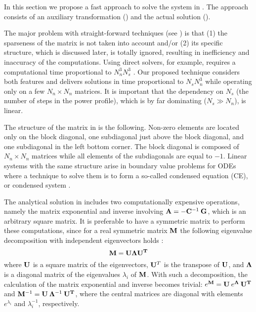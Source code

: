 In this section we propose a fast approach to solve the system in . The approach consists of an auxiliary transformation () and the actual solution ().

The major problem with straight-forward techniques (see ) is that (1) the sparseness of the matrix is not taken into account and/or (2) its specific structure, which is discussed later, is totally ignored, resulting in inefficiency and inaccuracy of the computations. Using direct solvers, for example, requires a computational time proportional to $N_n^3 N_s^3$ \cite{press2007}. Our proposed technique considers both features and delivers solutions in time proportional to $N_s N_n^3$ while operating only on a few $N_n \times N_n$ matrices. It is important that the dependency on $N_s$ (the number of steps in the power profile), which is by far dominating ($N_s \gg N_n$), is linear.

The structure of the matrix in  is the following. Non-zero elements are located only on the block diagonal, one subdiagonal just above the block diagonal, and one subdiagonal in the left bottom corner. The block diagonal is composed of $N_n \times N_n$ matrices while all elements of the subdiagonals are equal to $-1$. Linear systems with the same structure arise in boundary value problems for ODEs where a technique to solve them is to form a so-called condensed equation (CE), or condensed system \cite{stoer2002}.

 \label{sec:ce-auxiliary}
The analytical solution in  includes two computationally expensive operations, namely the matrix exponential and inverse involving \mbox{$\mathbf{A} = - \mathbf{C}^{-1} \: \mathbf{G}$}, which is an arbitrary square matrix. It is preferable to have a symmetric matrix to perform these computations, since for a real symmetric matrix $\mathbf{M}$ the following eigenvalue decomposition with independent eigenvectors holds \cite{press2007}:
\begin{equation} \label{eq:eigenvalue-decomposition}
  \mathbf{M} = \mathbf{U} \mathbf{\Lambda} \mathbf{U}^{\mathbf{T}}
\end{equation}
where $\mathbf{U}$ is a square matrix of the eigenvectors, $\mathbf{U}^T$ is the transpose of $\mathbf{U}$, and $\mathbf{\Lambda}$ is a diagonal matrix of the eigenvalues $\lambda_i$ of $\mathbf{M}$. With such a decomposition, the calculation of the matrix exponential and inverse becomes trivial: $e^{\mathbf{M}} = \mathbf{U} \: e^{\mathbf{\Lambda}} \: \mathbf{U}^{\mathbf{T}}$ and $\mathbf{M}^{-1} = \mathbf{U} \: \mathbf{\Lambda}^{-1} \: \mathbf{U}^{\mathbf{T}}$, where the central matrices are diagonal with elements $e^{\lambda_i}$ and $\lambda_i^{-1}$, respectively.

